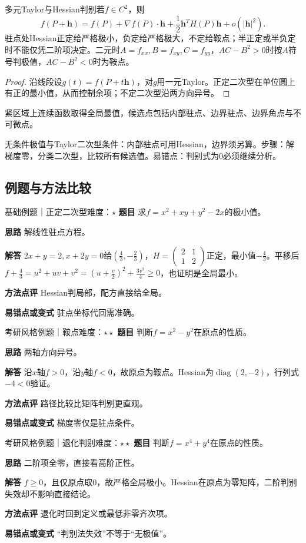 \begin{theorem}{多元Taylor与Hessian判别}若$f\in C^2$，则
\begin{equation}f(P+\bm h)=f(P)+\nabla f(P)\cdot\bm h+\dfrac12\bm h^TH(P)\bm h+o(|\bm h|^2).\end{equation}
驻点处Hessian正定给严格极小，负定给严格极大，不定给鞍点；半正定或半负定时不能仅凭二阶项决定。二元时$A=f_{xx},B=f_{xy},C=f_{yy}$，$AC-B^2>0$时按$A$符号判极值，$AC-B^2<0$时为鞍点。\end{theorem}
\begin{proof}沿线段设$g(t)=f(P+t\bm h)$，对$g$用一元Taylor。正定二次型在单位圆上有正的最小值，从而控制余项；不定二次型沿两方向异号。\end{proof}
紧区域上连续函数取得全局最值，候选点包括内部驻点、边界驻点、边界角点与不可微点。

\begin{method}{无条件极值与Taylor二次型}条件：内部驻点可用Hessian，边界须另算。步骤：解梯度零，分类二次型，比较所有候选值。易错点：判别式为0必须继续分析。\end{method}
\subsection{例题与方法比较}
\begin{example}{基础例题｜正定二次型}{难度：$\star$}
\label{ex:6:10}\textbf{题目} 求$f=x^2+xy+y^2-2x$的极小值。\par
\textbf{思路} 解线性驻点方程。\par
\textbf{解答} $2x+y=2,x+2y=0$给$(\frac{4}{3},-\frac{2}{3})$，$H=\begin{pmatrix}2&1\\1&2\end{pmatrix}$正定，最小值$-\frac{4}{3}$。平移后$f+\frac{4}{3}=u^2+uv+v^2=(u+\frac{v}{2})^2+\frac{3v^2}{4}\ge0$，也证明是全局最小。\par
\textbf{方法点评} Hessian判局部，配方直接给全局。\par
\textbf{易错点或变式} 驻点坐标代回需准确。
\end{example}
\begin{example}{考研风格例题｜鞍点}{难度：$\star\star$}
\label{ex:6:11}\textbf{题目} 判断$f=x^2-y^2$在原点的性质。\par
\textbf{思路} 两轴方向异号。\par
\textbf{解答} 沿$x$轴$f>0$，沿$y$轴$f<0$，故原点为鞍点。Hessian为$\operatorname{diag}(2,-2)$，行列式$-4<0$验证。\par
\textbf{方法点评} 路径比较比矩阵判别更直观。\par
\textbf{易错点或变式} 梯度零仅是驻点条件。
\end{example}
\begin{example}{考研风格例题｜退化判别}{难度：$\star\star$}
\label{ex:6:12}\textbf{题目} 判断$f=x^4+y^4$在原点的性质。\par
\textbf{思路} 二阶项全零，直接看高阶正性。\par
\textbf{解答} $f\ge0$，且仅原点取0，故严格全局极小。Hessian在原点为零矩阵，二阶判别失效却不影响直接结论。\par
\textbf{方法点评} 退化时回到定义或最低非零齐次项。\par
\textbf{易错点或变式} “判别法失效”不等于“无极值”。
\end{example}
